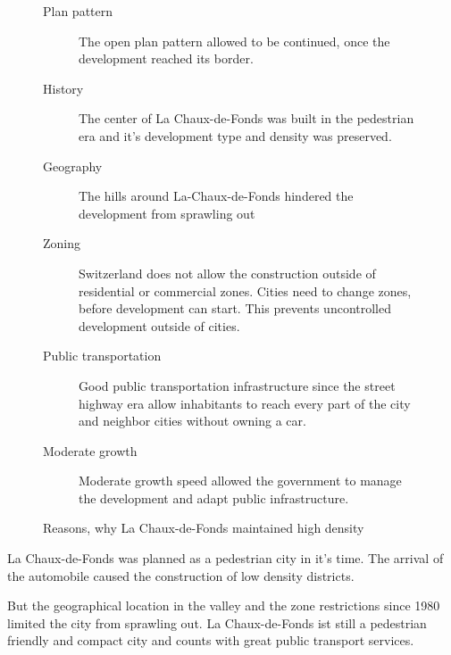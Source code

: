 \documentclass{article}
\begin{document}
\begin{multicols}{2}
			\begin{figure}[H]
				\begin{description}
					\item [Plan pattern] The open plan pattern allowed to be continued, once the development reached its border.
					\item [History] The center of La Chaux-de-Fonds was built in the pedestrian era and it's development type and density was preserved.
					\item [Geography] The hills around La-Chaux-de-Fonds hindered the development from sprawling out
					\item [Zoning] Switzerland does not allow the construction outside of residential or commercial zones. Cities need to change zones, before development can start. This prevents uncontrolled development outside of cities.
					\item [Public transportation] Good public transportation infrastructure since the street highway era allow inhabitants to reach every part of the city and neighbor cities without owning a car.
					\item [Moderate growth] Moderate growth speed allowed the government to manage the development and adapt public infrastructure.
				\end{description}
				\caption{Reasons, why La Chaux-de-Fonds maintained high density}
				\label{fig:la-chaux-de-fonds-development-reasons}
			\end{figure}
			
			La Chaux-de-Fonds was planned as a pedestrian city in it's time.
			The arrival of the automobile caused the construction of low density districts.
			
			But the geographical location in the valley and the zone restrictions since 1980 limited the city from sprawling out.
			La Chaux-de-Fonds ist still a pedestrian friendly and compact city and counts with great public transport services.
			
		\end{multicols}
		
		
		
		\clearpage
\end{document}
